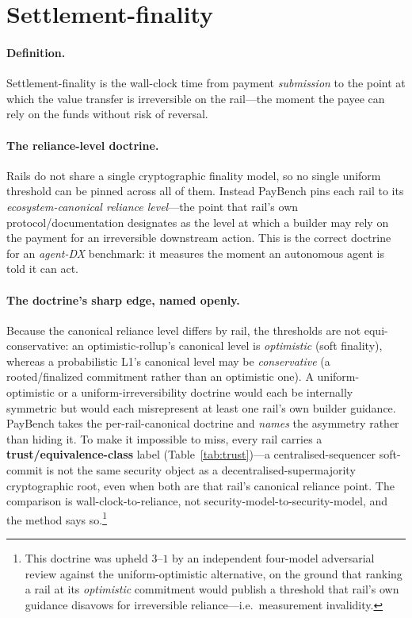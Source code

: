 \documentclass[11pt]{article}
\begin{document}
\section{Settlement-finality}\label{sec:finality}
\paragraph{Definition.} Settlement-finality is the wall-clock time from payment \emph{submission} to
the point at which the value transfer is irreversible on the rail---the moment the payee can rely on
the funds without risk of reversal.

\paragraph{The reliance-level doctrine.} Rails do not share a single cryptographic finality model, so
no single uniform threshold can be pinned across all of them. Instead PayBench pins each rail to its
\emph{ecosystem-canonical reliance level}---the point that rail's own protocol/documentation
designates as the level at which a builder may rely on the payment for an irreversible downstream
action. This is the correct doctrine for an \emph{agent-DX} benchmark: it measures the moment an
autonomous agent is told it can act.

\paragraph{The doctrine's sharp edge, named openly.} Because the canonical reliance level differs by
rail, the thresholds are not equi-conservative: an optimistic-rollup's canonical level is
\emph{optimistic} (soft finality), whereas a probabilistic L1's canonical level may be
\emph{conservative} (a rooted/finalized commitment rather than an optimistic one). A uniform-optimistic
or a uniform-irreversibility doctrine would each be internally symmetric but would each misrepresent at
least one rail's own builder guidance. PayBench takes the per-rail-canonical doctrine and \emph{names}
the asymmetry rather than hiding it. To make it impossible to miss, every rail carries a
\textbf{trust/equivalence-class} label (Table~\ref{tab:trust})---a centralised-sequencer soft-commit is
not the same security object as a decentralised-supermajority cryptographic root, even when both are
that rail's canonical reliance point. The comparison is wall-clock-to-reliance, not
security-model-to-security-model, and the method says so.\footnote{This doctrine was upheld $3$--$1$ by
an independent four-model adversarial review against the uniform-optimistic alternative, on the ground
that ranking a rail at its \emph{optimistic} commitment would publish a threshold that rail's own
guidance disavows for irreversible reliance---i.e.\ measurement invalidity.}
\end{document}
